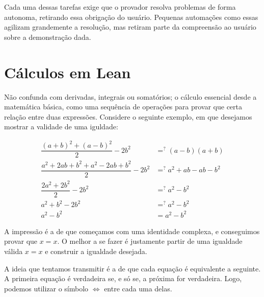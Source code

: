 \noindent Cada uma dessas tarefas exige que o provador resolva problemas de forma autonoma, retirando essa obrigação do usuário. Pequenas automações como essas agilizam grandemente a resolução, mas retiram parte da compreensão ao usuário sobre a demonstração dada.

\section{Cálculos em Lean}
Não confunda com derivadas, integrais ou somatórios; o cálculo essencial desde a matemática básica, como uma sequência de operações para provar que certa relação entre duas expressões. Considere o seguinte exemplo, em que desejamos mostrar a validade de uma iguldade:

\begin{equation*}
    \begin{aligned}
      \dfrac{(a+b)^2+(a-b)^2}{2}-2b^2 &=^? (a-b)(a+b)\\
      \dfrac{a^2+2ab+b^2+a^2-2ab+b^2}{2}-2b^2 &=^? a^2+ab-ab-b^2\\
      \dfrac{2a^2+2b^2}{2}-2b^2 &=^? a^2-b^2\\
      a^2+b^2-2b^2 &=^? a^2-b^2\\
      a^2-b^2 &= a^2-b^2
    \end{aligned}
\end{equation*}

\noindent A impressão é a de que começamos com uma identidade complexa, e conseguimos provar que $x=x$. O melhor a se fazer é justamente partir de uma igualdade válida $x=x$ e construir a igualdade desejada.



A ideia que tentamos transmitir é a de que cada equação é equivalente a seguinte. A primeira equação é verdadeira se, e só se, a próxima for verdadeira. Logo, podemos utilizar o símbolo $\iff$ entre cada uma delas.

